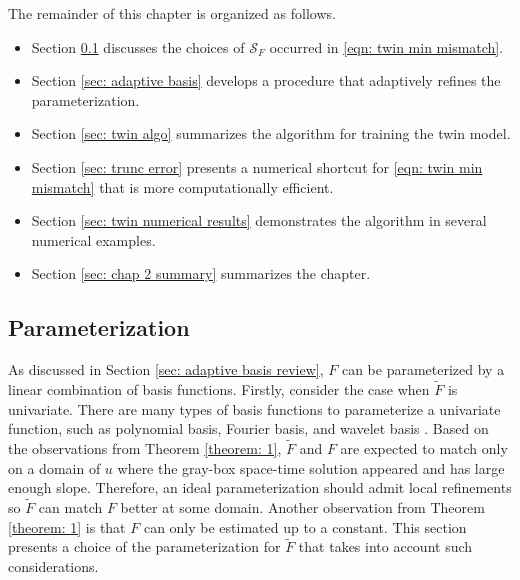 The remainder of this chapter is organized as follows.
\begin{itemize}
    \item Section \ref{sec: flux param} discusses the choices of $\mathcal{S}_F$ occurred
    in \eqref{eqn: twin min mismatch}.
    \item Section \ref{sec: adaptive basis} develops a procedure that adaptively refines the
    parameterization. 
    \item Section \ref{sec: twin algo} summarizes the algorithm for training the twin model.
    \item Section \ref{sec: trunc error} presents a numerical shortcut for \eqref{eqn: twin min mismatch} 
    that is more computationally efficient.
    \item Section \ref{sec: twin numerical results} demonstrates the algorithm in several numerical examples.
    \item Section \ref{sec: chap 2 summary} summarizes the chapter.\\
\end{itemize}



\subsection{Parameterization}
\label{sec: flux param}
As discussed in Section \ref{sec: adaptive basis review}, 
$F$ can be parameterized by a linear combination of basis functions.
Firstly, consider the case when $\tilde{F}$ is univariate. 
There are many types of basis
functions to parameterize a univariate function, such as polynomial basis, Fourier basis, and
wavelet basis \cite{wavelet mallat}. 
Based on the observations from Theorem \ref{theorem: 1}, $\tilde{F}$ and $F$
are expected to match only on a domain of $u$ 
where the gray-box space-time solution appeared and has large enough slope.
Therefore, an ideal parameterization should 
admit local refinements so $\tilde{F}$ can match $F$ better at some domain.
Another observation from Theorem \ref{theorem: 1} is that $F$ can only be estimated up to 
a constant.
This section presents a choice of the parameterization for $\tilde{F}$ that takes into account
such considerations.\\

